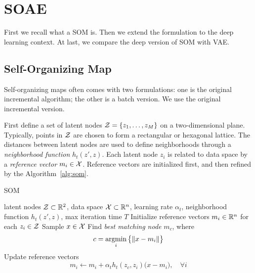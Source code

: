 \section{SOAE}\label{sec:soae}

First we recall what a SOM is.
Then we extend the formulation to the deep learning context.
At last,
we compare the deep version of SOM with VAE\@.

\subsection{Self-Organizing Map}

Self-organizing maps often comes with two formulations:
one is the original incremental algorithm;
the other is a batch version.
We use the original incremental version.

First define a set of latent nodes
\( \mathcal{Z}=\{z_1,\dots,z_M\} \)
on a two-dimensional plane.
Typically,
points in \( \mathcal{Z} \) are chosen to form a rectangular or hexagonal lattice.
The distances between latent nodes are used to define neighborhoods
through a \emph{neighborhood function} \( h_t(z',z) \).
Each latent node \( z_i \) is related to data space by a \emph{reference vector}
\( m_i\in\mathcal{X} \).
Reference vectors are initialized first,
and then refined by the Algorithm~\ref{alg:som}.

\begin{algorithm}[tb]
    \caption{SOM~\cite{kohonen1982self, kohonen1998self}}\label{alg:som}
 \begin{algorithmic}
        latent nodes \(\mathcal{Z}\subset{\mathbb{R}}^2\),
        data space \(\mathcal{X}\subset{\mathbb{R}}^n\),
        learning rate \(\alpha_t\),
        neighborhood function \(h_t(z',z)\),
        max iteration time \(T\)
    \STATE
    \STATE Initialize reference vectors \(m_i\in{\mathbb{R}}^n\) for each \(z_i\in\mathcal{Z}\)
    \STATE Sample \(x\in\mathcal{X}\)
    \STATE Find \emph{best matching node} \(m_c\),
        where
        \begin{equation}
            c = \mathop{\mathrm{argmin}}_i \big\{\|x-m_i\|\big\}
        \end{equation}
    \STATE Update reference vectors
        \begin{equation}\label{eq:som_update}
            m_i \leftarrow m_i + \alpha_t h_t(z_c,z_i)\big(x-m_i\big),\quad\forall i
        \end{equation}
    \ENDFOR
\end{algorithmic}
\end{algorithm}

